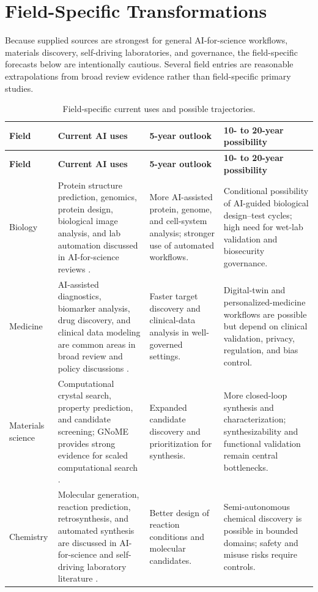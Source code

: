 \documentclass[12pt]{article}
\begin{document}
\section{Field-Specific Transformations}

Because supplied sources are strongest for general AI-for-science workflows, materials discovery, self-driving laboratories, and governance, the field-specific forecasts below are intentionally cautious. Several field entries are reasonable extrapolations from broad review evidence rather than field-specific primary studies.

\begin{longtable}{p{2.5cm}p{4.0cm}p{4.0cm}p{4.0cm}}
\caption{Field-specific current uses and possible trajectories.}\\
\toprule
\textbf{Field} & \textbf{Current AI uses} & \textbf{5-year outlook} & \textbf{10- to 20-year possibility} \\
\midrule
\endfirsthead
\toprule
\textbf{Field} & \textbf{Current AI uses} & \textbf{5-year outlook} & \textbf{10- to 20-year possibility} \\
\midrule
\endhead
Biology & Protein structure prediction, genomics, protein design, biological image analysis, and lab automation discussed in AI-for-science reviews \cite{ref1}. & More AI-assisted protein, genome, and cell-system analysis; stronger use of automated workflows. & Conditional possibility of AI-guided biological design--test cycles; high need for wet-lab validation and biosecurity governance. \\
Medicine & AI-assisted diagnostics, biomarker analysis, drug discovery, and clinical data modeling are common areas in broad review and policy discussions \cite{ref1,ref4}. & Faster target discovery and clinical-data analysis in well-governed settings. & Digital-twin and personalized-medicine workflows are possible but depend on clinical validation, privacy, regulation, and bias control. \\
Materials science & Computational crystal search, property prediction, and candidate screening; GNoME provides strong evidence for scaled computational search \cite{ref6}. & Expanded candidate discovery and prioritization for synthesis. & More closed-loop synthesis and characterization; synthesizability and functional validation remain central bottlenecks. \\
Chemistry & Molecular generation, reaction prediction, retrosynthesis, and automated synthesis are discussed in AI-for-science and self-driving laboratory literature \cite{ref1,ref5}. & Better design of reaction conditions and molecular candidates. & Semi-autonomous chemical discovery is possible in bounded domains; safety and misuse risks require controls. \\

\end{longtable}
\end{document}
